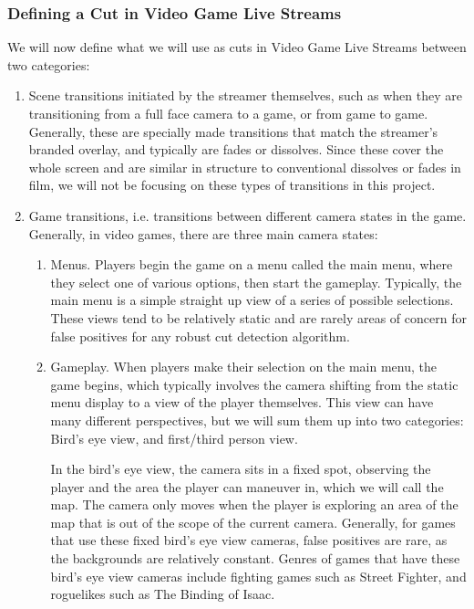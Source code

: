 \documentclass[12pt]{article}
\begin{document}
\subsubsection{Defining a Cut in Video Game Live Streams}
We will now define what we will use as cuts in Video Game Live Streams between two categories:
\begin{enumerate}
    \item Scene transitions initiated by the streamer themselves, such as when they are transitioning from a full face camera to a game, or from game to game. Generally, 
    these are specially made transitions that match the streamer's branded overlay, and typically are fades or dissolves. Since these cover the whole screen and are 
    similar in structure to conventional dissolves or fades in film, we will not be focusing on these types of transitions in this project.
    \item Game transitions, i.e. transitions between different camera states in the game. Generally, in video games, there are three main camera states:
    \begin{enumerate}
        \item Menus. Players begin the game on a menu called the main menu, where they select one of various options, then start the gameplay. Typically, the main menu
        is a simple straight up view of a series of possible selections. These views tend to be relatively static and are rarely areas of concern for false positives for 
        any robust cut detection algorithm.
        \item Gameplay. When players make their selection on the main menu, the game begins, which typically involves the camera shifting from the static menu display to a 
        view of the player themselves. This view can have many different perspectives, but we will sum them up into two categories: Bird's eye view, and first/third person view.
        
        In the bird's eye view, the camera sits in a fixed spot, observing the player and the area the player can maneuver in, which we will call the map. The camera only 
        moves when the player is exploring an area of the map that is out of the scope of the current camera. Generally, for games that use these fixed bird's eye view 
        cameras, false positives are rare, as the backgrounds are relatively constant. Genres of games that have these bird's eye view cameras include fighting games such as Street Fighter, 
        and roguelikes such as The Binding of Isaac. 


\end{enumerate}
\end{enumerate}
\end{document}
